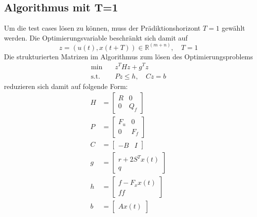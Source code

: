 \documentclass[a4paper,10pt]{scrartcl}
\begin{document}
\subsection{Algorithmus mit T=1}%
\label{sec:algorithust1}
Um die test cases lösen zu können, muss der Prädiktionshorizont $T=1$ gewählt werden. Die Optimierungsvariable beschränkt sich damit auf
\begin{equation*}
  z=\left( u(t), x(t+T) \right)\in\mathbb{R}^{(m+n)}, \quad T=1
\end{equation*}
Die strukturierten Matrizen im Algorithmus zum lösen des Optimierungsproblems
\begin{equation*}\begin{split}
  \min \quad &z^{T}Hz+g^{T}z\\
  \text{s.t.} \quad &Pz\leq h, \quad Cz = b 
\end{split}\end{equation*}
reduzieren sich damit auf folgende Form:
\begin{equation*}\begin{split}
  H&=\begin{bmatrix}
  R & 0\\ 
  0 & Q_{f}
  \end{bmatrix}\\
  P&=\begin{bmatrix}
  F_{u} & 0\\ 
  0 & F_{f}
  \end{bmatrix}\\
  C&=\begin{bmatrix}
  -B & I
  \end{bmatrix}\\
  g&=\begin{bmatrix}
  r+2S^{T}x(t)\\ 
  q
  \end{bmatrix}\\
  h&=\begin{bmatrix}
  f-F_{x}x(t)\\ 
  f{f}
  \end{bmatrix}\\
  b&=\begin{bmatrix}
  Ax(t)
  \end{bmatrix}\\
\end{split}\end{equation*}
\end{document}
